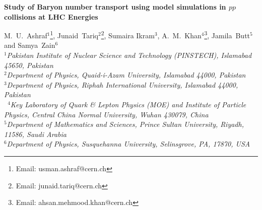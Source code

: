 \documentclass{article}
\begin{document}


\begin{center}
{\Large \bf Study of Baryon number transport using model simulations in $pp$ collisions at LHC Energies}

\vskip1.0cm
M.~U.~Ashraf$^{1}${\footnote{Email: usman.ashraf@cern.ch}},
Junaid~Tariq$^{2}${\footnote{Email: junaid.tariq@cern.ch}},
Sumaira Ikram$^{3}$,
A.~M.~Khan$^{4}${\footnote{Email: ahsan.mehmood.khan@cern.ch}},
Jamila~Butt$^{5}$ and
Samya~Zain$^{6}$\\

{\small\it 
$^1$Pakistan Institute of Nuclear Science and Technology (PINSTECH), Islamabad 45650, Pakistan\\
$^2$Department of Physics, Quaid-i-Azam University, Islamabad 44000, Pakistan\\
$^3$Department of Physics, Riphah International University, Islamabad 44000, Pakistan\\\
$^4$Key Laboratory of Quark \& Lepton Physics (MOE) and Institute of Particle Physics,
Central China Normal University, Wuhan 430079, China\\
$^5$Department of Mathematics and Sciences, Prince Sultan University, Riyadh,  11586, Saudi Arabia\\
$^6$Department of Physics, Susquehanna University, Selinsgrove, PA, 17870, USA}
\end{center}

\vskip1.0cm

\end{document}
